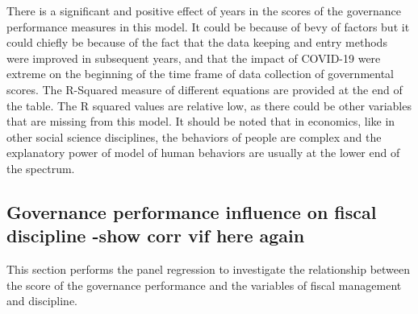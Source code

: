There is a significant and positive effect of years in the scores of the governance performance measures in this model. It could be because of bevy of factors but it could chiefly be because of the fact that the data keeping and entry methods were improved in subsequent years, and that the impact of COVID-19 were extreme on the beginning of the time frame of data collection of governmental scores. The R-Squared measure of different equations are provided at the end of the table. The R squared values are relative low, as there could be other variables that are missing from this model.  It should be noted that in economics, like in other social science disciplines, the behaviors of people are complex and the explanatory power of model of human behaviors are usually at the lower end of the spectrum.\\
\subsection{Governance performance influence on fiscal discipline -show corr vif here again}
This section performs the panel regression to investigate the relationship between the score of the governance performance and the variables of fiscal management and discipline. 
